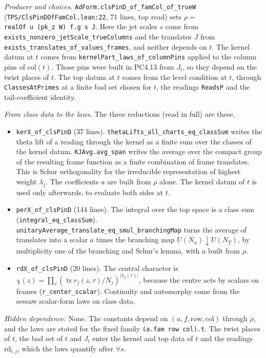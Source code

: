 \documentclass[11pt]{article}
\newcommand{\lean}[1]{\nolinkurl{#1}}
\newcommand{\Lpath}[1]{\nolinkurl{#1}}
\theoremstyle{remark}
\begin{document}
\emph{Producer and choices.} \lean{AdForm.clsPinD_of_famCol_of_trueW} (\Lpath{TPS/ClsPinDOfFamCol.lean:22}, 71 lines, top read) sets $\rho=$\lean{realOf}~\lean{u}~\lean{(pk_z}~\lean{W)}~\lean{f.g}~\lean{s}~\lean{J}. Here the jet scales $s$ come from \lean{exists_nonzero_jetScale_trueColumns} and the translates $J$ from \lean{exists_translates_of_values_frames}, and neither depends on $t$. The kernel datum at $t$ comes from \lean{kernelPart_laws_of_columnPins} applied to the column pins of $\mathrm{col}(t)$. Those pins were built in PC4.13 from $J_t$, so they depend on the twist places of $t$. The top datum at $t$ comes from the level condition at $t$, through \lean{ClassesAtPrimes} at a finite bad set chosen for $t$, the readings \lean{ReadsP} and the tail-coefficient identity.

\emph{From class data to the laws.} The three reductions (read in full) are these.
\begin{itemize}
\item \lean{kerX_of_clsPinD} (37 lines). \lean{thetaLifts_all_charts_eq_classSum} writes the theta lift of a reading through the kernel as a finite sum over the classes of the kernel datum. \lean{KJAvg.avg_span} writes the average over the compact group of the resulting frame function as a finite combination of frame translates. This is Schur orthogonality for the irreducible representation of highest weight $\lambda_j$. The coefficients $a$ are built from $\rho$ alone. The kernel datum of $t$ is used only afterwards, to evaluate both sides at $t$.
\item \lean{perX_of_clsPinD} (144 lines). The integral over the top space is a class sum (\lean{integral_eq_classSum}). \lean{unitaryAverage_translate_eq_smul_branchingMap} turns the average of translates into a scalar $a$ times the branching map $U(N_n)\downarrow U(N_T)$, by multiplicity one of the branching and Schur's lemma, with $a$ built from $\rho$.
\item \lean{rdX_of_clsPinD} (20 lines). The central character is $\chi(z)=\prod_\tau(\operatorname{tr}r_j(z,\tau)/N_j)^{\lvert\lambda_j(\tau)\rvert}$, because the centre acts by scalars on frames (\lean{r_center_scalar}). Continuity and automorphy come from the seesaw scalar-form laws on class data.
\end{itemize}

\emph{Hidden dependence.} None. The constants depend on $(u,f,\text{row},\text{col})$ through $\rho$, and the laws are stated for the fixed family \lean{(a.fam}~\lean{row}~\lean{col).t}. The twist places of $t$, the bad set of $t$ and $J_t$ enter the kernel and top data of $t$ and the readings $\mathrm{rd}_{t,j}$, which the laws quantify after $\forall s$.
\end{document}
